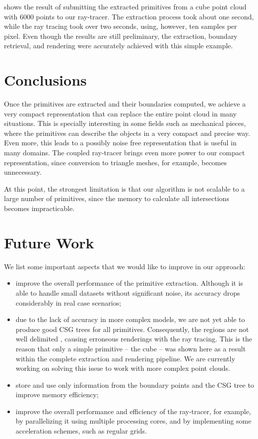 \documentclass[10pt, conference]{IEEEtran}
\begin{document}
 shows the result of submitting the extracted primitives from a cube point cloud with 6000 points to our ray-tracer. The extraction process took about one second, while the ray tracing took over two seconds, using, however, ten samples per pixel. Even though the results are still preliminary, the extraction, boundary retrieval, and rendering were accurately achieved with this simple example.



\section{Conclusions}

Once the primitives are extracted and their boundaries computed, we achieve a very compact representation that can replace the entire point cloud in many situations.
This is specially interesting in some fields such as mechanical pieces, where the primitives can describe the objects in a very compact and precise way. Even more, this leads to a possibly noise free representation that is useful in many domains.
The coupled ray-tracer brings even more power to our compact representation, since conversion to triangle meshes, for example, becomes unnecessary.

At this point, the strongest limitation is that our algorithm is not scalable to a large number of primitives, since the memory to calculate all intersections becomes impracticable. 

\section{Future Work}

We list some important aspects that we would like to improve in our approach:
\begin{itemize}
\item improve the overall performance of the primitive extraction. Although it is able to handle small datasets without significant noise, its accuracy drops considerably in real case scenarios;
\item due to the lack of accuracy in more complex models, we are not yet able to produce good CSG trees for all primitives. Consequently, the regions are not well delimited , causing erroneous renderings with the ray tracing. This is the reason that only a simple primitive -- the cube -- was shown here as a result within the complete extraction and rendering pipeline. We are currently working on solving this issue to work with more complex point clouds.
\item store and use only information from the boundary points and the CSG tree to improve memory efficiency;
\item improve the overall performance and efficiency of the ray-tracer, for example, by parallelizing it using multiple processing cores, and by implementing some acceleration schemes, such as regular grids.
\end{itemize}
\end{document}
